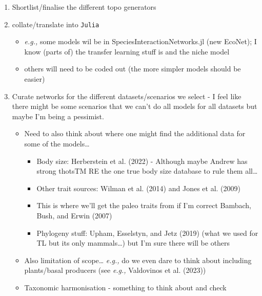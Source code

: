 \documentclass[
  letterpaper,
  DIV=11,
  numbers=noendperiod]{scrartcl}
\providecommand{\tightlist}{%
  \setlength{\itemsep}{0pt}\setlength{\parskip}{0pt}}\usepackage{longtable,booktabs,array}
\begin{document}
\begin{enumerate}
\def\labelenumi{\arabic{enumi}.}
\tightlist
\item
  Shortlist/finalise the different topo generators
\item
  collate/translate into \texttt{Julia}

  \begin{itemize}
  \tightlist
  \item
    \emph{e.g.,} some models wil be in SpeciesInteractionNetworks.jl
    (new EcoNet); I know (parts of) the transfer learning stuff is and
    the niche model
  \item
    others will need to be coded out (the more simpler models should be
    easier)
  \end{itemize}
\item
  Curate networks for the different datasets/scenarios we select - I
  feel like there might be some scenarios that we can't do all models
  for all datasets but maybe I'm being a pessimist.

  \begin{itemize}
  \tightlist
  \item
    Need to also think about where one might find the additional data
    for some of the models\ldots{}

    \begin{itemize}
    \tightlist
    \item
      Body size: Herberstein et al. (2022) - Although maybe Andrew has
      strong thotsTM RE the one true body size database to rule them
      all\ldots{}
    \item
      Other trait sources: Wilman et al. (2014) and Jones et al. (2009)
    \item
      This is where we'll get the paleo traits from if I'm correct
      Bambach, Bush, and Erwin (2007)
    \item
      Phylogeny stuff: Upham, Esselstyn, and Jetz (2019) (what we used
      for TL but its only mammals\ldots) but I'm sure there will be
      others
    \end{itemize}
  \item
    Also limitation of scope\ldots{} \emph{e.g.,} do we even dare to
    think about including plants/basal producers (see \emph{e.g.,}
    Valdovinos et al. (2023))
  \item
    Taxonomic harmonisation - something to think about and check
  \end{itemize}
\end{enumerate}
\end{document}
